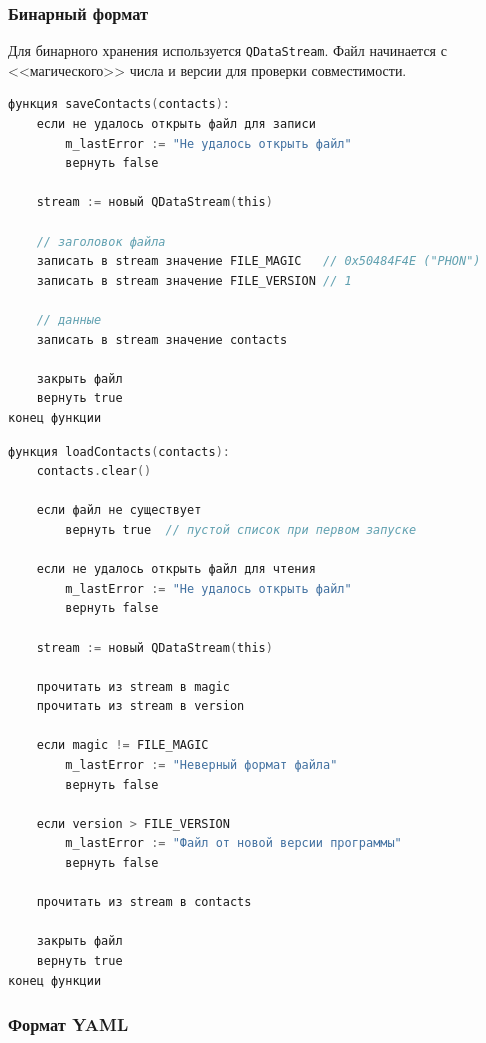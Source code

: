 \subsubsection*{Бинарный формат}

Для бинарного хранения используется \texttt{QDataStream}. Файл начинается с <<магического>> числа и версии для проверки совместимости.

\begin{lstlisting}[language=C, caption=Функция saveContacts]
функция saveContacts(contacts):
    если не удалось открыть файл для записи
        m_lastError := "Не удалось открыть файл"
        вернуть false
    
    stream := новый QDataStream(this)
    
    // заголовок файла
    записать в stream значение FILE_MAGIC   // 0x50484F4E ("PHON")
    записать в stream значение FILE_VERSION // 1
    
    // данные
    записать в stream значение contacts
    
    закрыть файл
    вернуть true
конец функции
\end{lstlisting}

\begin{lstlisting}[language=C, caption=Функция loadContacts]
функция loadContacts(contacts):
    contacts.clear()
    
    если файл не существует
        вернуть true  // пустой список при первом запуске
    
    если не удалось открыть файл для чтения
        m_lastError := "Не удалось открыть файл"
        вернуть false
    
    stream := новый QDataStream(this)
    
    прочитать из stream в magic
    прочитать из stream в version
    
    если magic != FILE_MAGIC
        m_lastError := "Неверный формат файла"
        вернуть false
    
    если version > FILE_VERSION
        m_lastError := "Файл от новой версии программы"
        вернуть false
    
    прочитать из stream в contacts
    
    закрыть файл
    вернуть true
конец функции
\end{lstlisting}

\subsubsection*{Формат YAML}

